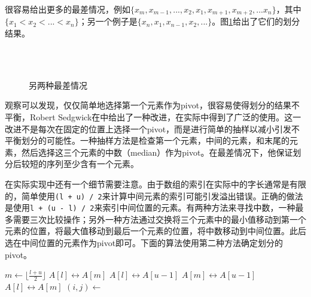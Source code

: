 \documentclass{ctexart}
\begin{document}
很容易给出更多的最差情况，例如$\{ x_m, x_{m-1}, ..., x_2, x_1, x_{m+1}, x_{m+2}, ... x_n\}$，其中$\{ x_1 < x_2 < ... < x_n \}$；另一个例子是$\{x_n, x_1, x_{n-1}, x_2, ... \}$。图\ref{fig:worst-cases-2}给出了它们的划分结果。

\begin{figure}[htbp]
   \centering
    \\
    \\
   \caption{另两种最差情况}
   \label{fig:worst-cases-2}
\end{figure}

观察可以发现，仅仅简单地选择第一个元素作为pivot，很容易使得划分的结果不平衡，Robert Sedgwick在\cite{qsort-impl}中给出了一种改进，在实际中得到了广泛的使用。这一改进不是每次在固定的位置上选择一个pivot，而是进行简单的抽样以减小引发不平衡划分的可能性。一种抽样方法是检查第一个元素，中间的元素，和末尾的元素，然后选择这三个元素的中数（median）作为pivot。在最差情况下，他保证划分后较短的序列至少含有一个元素。

在实际实现中还有一个细节需要注意。由于数组的索引在实际中的字长通常是有限的，简单使用\texttt{(l + u) / 2}来计算中间元素的索引可能引发溢出错误。正确的做法是使用\texttt{l + (u - l) / 2}来索引中间位置的元素。有两种方法来寻找中数，一种最多需要三次比较操作\cite{3-way-part}；另外一种方法通过交换将三个元素中的最小值移动到第一个元素的位置，将最大值移动到最后一个元素的位置，将中数移动到中间位置。此后选在中间位置的元素作为pivot即可。下面的算法使用第二种方法确定划分的pivot。

\begin{algorithmic}[1]
    \State $m \gets \lfloor \frac{l + u}{2} \rfloor$ 
     
      \State {} $A[l] \leftrightarrow A[m]$
    \EndIf
     
      \State {} $A[l] \leftrightarrow A[u-1]$
    \EndIf
     
      \State {} $A[m] \leftrightarrow A[u-1]$
    \EndIf
    \State {} $A[l] \leftrightarrow A[m]$
    \State $(i, j) \gets $ 
    \State {}
    \State {}
  \EndIf
\EndProcedure
\end{algorithmic}
\end{document}
